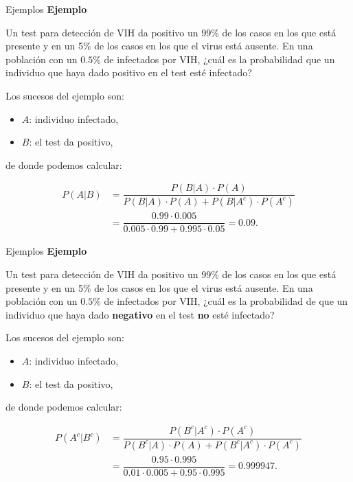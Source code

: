 \documentclass[
  ignorenonframetext,
]{beamer}
\providecommand{\tightlist}{%
  \setlength{\itemsep}{0pt}\setlength{\parskip}{0pt}}
\begin{document}
\begin{frame}{Ejemplos}
\protect\hypertarget{ejemplos-6}{}
\textbf{Ejemplo}

Un test para detección de VIH da positivo un 99\% de los casos en los
que está presente y en un 5\% de los casos en los que el virus está
ausente. En una población con un \(0.5\%\) de infectados por VIH, ¿cuál
es la probabilidad que un individuo que haya dado positivo en el test
esté infectado?

Los sucesos del ejemplo son:

\begin{itemize}
\tightlist
\item
  \(A\): individuo infectado,
\item
  \(B\): el test da positivo,
\end{itemize}

de donde podemos calcular:

\[
\begin{array}{rl}
P(A|B) & =\dfrac{P(B|A)\cdot P(A)}{P(B|A)\cdot P(A)+P(B|A^c)\cdot P(A^c)}\\
&=\dfrac{0.99\cdot 0.005}{0.005\cdot 0.99+0.995\cdot 0.05}=0.09.\end{array}
\]
\end{frame}

\begin{frame}{Ejemplos}
\protect\hypertarget{ejemplos-7}{}
\textbf{Ejemplo}

Un test para detección de VIH da positivo un 99\% de los casos en los
que está presente y en un 5\% de los casos en los que el virus está
ausente. En una población con un \(0.5\%\) de infectados por VIH, ¿cuál
es la probabilidad de que un individuo que haya dado \textbf{negativo}
en el test \textbf{no} esté infectado?

Los sucesos del ejemplo son:

\begin{itemize}
\tightlist
\item
  \(A\): individuo infectado,
\item
  \(B\): el test da positivo,
\end{itemize}

de donde podemos calcular:

\[
\begin{array}{rl} P(A^c|B^c)& =\dfrac{P(B^c|A^c)\cdot P(A^c)}{P(B^c|A)\cdot P(A)+P(B^c|A^c)\cdot P(A^c)}\\ & =\dfrac{0.95\cdot 0.995}{0.01\cdot 0.005+0.95\cdot 0.995}=0.999947.\end{array}
\]
\end{frame}
\end{document}
